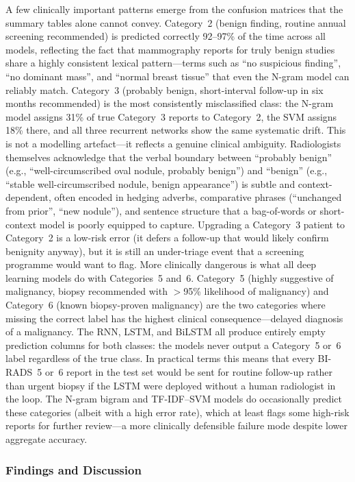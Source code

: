 \documentclass[11pt,a4paper]{article}
\begin{document}
A few clinically important patterns emerge from the confusion matrices that the
summary tables alone cannot convey.
Category~2 (benign finding, routine annual screening recommended) is predicted
correctly 92--97\% of the time across all models, reflecting the fact that
mammography reports for truly benign studies share a highly consistent lexical
pattern---terms such as ``no suspicious finding'', ``no dominant mass'', and
``normal breast tissue'' that even the N-gram model can reliably match.
Category~3 (probably benign, short-interval follow-up in six months recommended)
is the most consistently misclassified class: the N-gram model assigns 31\% of
true Category~3 reports to Category~2, the SVM assigns 18\% there, and all
three recurrent networks show the same systematic drift.
This is not a modelling artefact---it reflects a genuine clinical ambiguity.
Radiologists themselves acknowledge that the verbal boundary between
``probably benign'' (e.g., ``well-circumscribed oval nodule, probably
benign'') and ``benign'' (e.g., ``stable well-circumscribed nodule, benign
appearance'') is subtle and context-dependent, often encoded in hedging adverbs,
comparative phrases (``unchanged from prior'', ``new nodule''), and sentence
structure that a bag-of-words or short-context model is poorly equipped to
capture.
Upgrading a Category~3 patient to Category~2 is a low-risk error (it defers
a follow-up that would likely confirm benignity anyway), but it is still an
under-triage event that a screening programme would want to flag.
More clinically dangerous is what all deep learning models do with Categories~5
and~6.
Category~5 (highly suggestive of malignancy, biopsy recommended with
$>$95\% likelihood of malignancy) and Category~6 (known biopsy-proven
malignancy) are the two categories where missing the correct label has the
highest clinical consequence---delayed diagnosis of a malignancy.
The RNN, LSTM, and BiLSTM all produce entirely empty prediction columns for
both classes: the models never output a Category~5 or~6 label regardless of the
true class.
In practical terms this means that every BI-RADS~5 or~6 report in the test set
would be sent for routine follow-up rather than urgent biopsy if the LSTM
were deployed without a human radiologist in the loop.
The N-gram bigram and TF-IDF--SVM models do occasionally predict these
categories (albeit with a high error rate), which at least flags some
high-risk reports for further review---a more clinically defensible failure
mode despite lower aggregate accuracy.

\subsubsection{Findings and Discussion}
\end{document}
